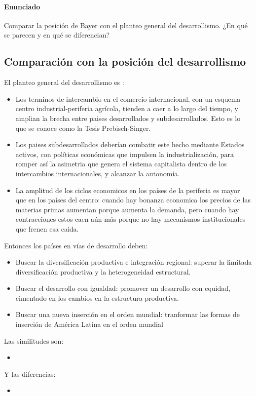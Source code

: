 \paragraph{Enunciado}
 Comparar la posición de Bayer con el planteo general del desarrollismo. ¿En qué se parecen y en qué se diferencian?

 \subsection*{Comparación con la posición del desarrollismo}

 El planteo general del desarrollismo es :
 \begin{itemize}
     \item Los terminos de intercambio en el comercio internacional, con un esquema centro industrial-periferia agrícola, tienden a caer a lo largo del tiempo,  y amplian la brecha entre paises desarrollados y subdesarrollados. Esto es lo que se conoce como la Tesis Prebisch-Singer.
     \item Los paises subdesarrollados deberían combatir este hecho mediante Estados activos, con políticas económicas que impulsen la industrialización, para romper así la asimetria que genera el sistema capitalista dentro de los intercambios internacionales, y alcanzar la autonomía.
    \item La amplitud de los ciclos economicos en los países de la periferia es mayor que en los países del centro: cuando hay bonanza economica los precios de las materias primas aumentan porque aumenta la demanda, pero cuando hay contracciones estos caen aún más porque no hay mecanismos institucionales que frenen esa caida.
 \end{itemize}

 Entonces los países en vías de desarrollo deben:

 \begin{itemize}
     \item Buscar la diversificación productiva e integración regional:  superar la limitada diversificación productiva y la heterogeneidad estructural.
     \item Buscar el desarrollo con igualdad: promover un desarrollo con equidad, cimentado en los cambios en la estructura productiva.
     \item Buscar una nueva inserción en el orden mundial: tranformar las formas de inserción de América Latina en el orden mundial
 \end{itemize}

 Las similitudes son:

 \begin{itemize}
     \item
 \end{itemize}

 Y las diferencias:

 \begin{itemize}
     \item
 \end{itemize}
